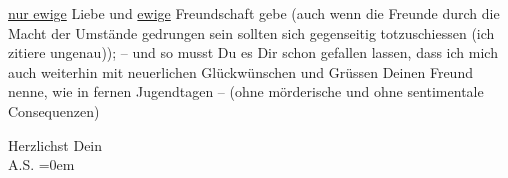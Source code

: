                   \uline{nur ewige} Liebe und \uline{ewige} Freundschaft gebe (auch wenn die Freunde durch die Macht der Umstände
               gedrungen sein sollten sich gegenseitig totzuschiessen (ich zitiere ungenau)); – und
               so musst Du es Dir schon gefallen lassen, dass ich mich auch weiterhin mit
               neuerlichen Glückwünschen und Grüssen Deinen Freund nenne, wie in fernen Jugendtagen
               – (ohne mörderische und ohne sentimentale Consequenzen)\pend
           
\pstart
           Herzlichst Dein {\\[\baselineskip]}\spacefill\mbox{A.S.}\pend
           \leftskip=0em{}\endnumbering{}  \newcommand{\dateiname}{L03519}\newcommand{\titel}{Arthur Schnitzler an Paul Goldmann, 9. 3. 1925}\newcommand{\editorInnen}{Martin Anton Müller und Laura Untner}
